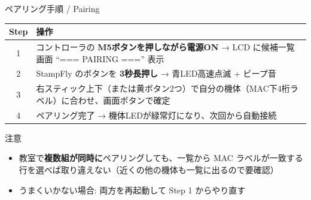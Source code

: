 \begin{frame}{ペアリング手順 / Pairing}
  \begin{table}
    \centering\small
    \begin{tabular}{cp{122mm}}
      \hline
      \textbf{Step} & \textbf{操作} \\
      \hline
      1 & コントローラの \textbf{M5ボタンを押しながら電源ON} → LCD に候補一覧画面 ``=== PAIRING ==='' 表示 \\
      2 & StampFly のボタンを \textbf{3秒長押し} → 青LED高速点滅 + ビープ音 \\
      3 & 右スティック上下（または黄ボタン2つ）で自分の機体（MAC下4桁ラベル）に合わせ、画面ボタンで確定 \\
      4 & ペアリング完了 → 機体LEDが緑常灯になり、次回から自動接続 \\
      \hline
    \end{tabular}
  \end{table}

  \begin{alertblock}{注意}
    \small
    \begin{itemize}
      \item 教室で\textbf{複数組が同時に}ペアリングしても、一覧から MAC ラベルが一致する行を選べば取り違えない（近くの他の機体も一覧に出るので要確認）
      \item うまくいかない場合: 両方を再起動して Step 1 からやり直す
    \end{itemize}
  \end{alertblock}
\end{frame}


